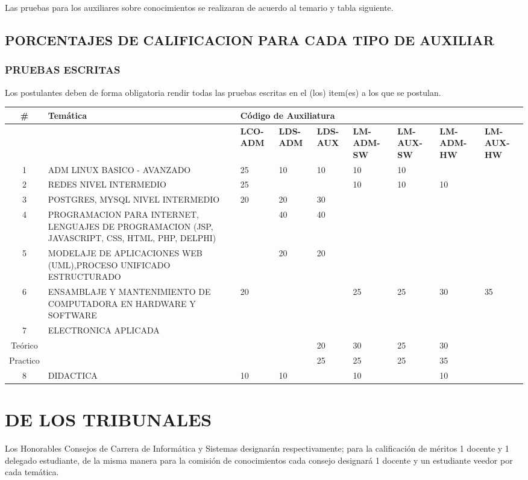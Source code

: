 \documentclass[letterpaper,11pt]{article}
\begin{document}
Las pruebas para los auxiliares sobre conocimientos se realizaran de acuerdo al temario y tabla siguiente.

\subsection{PORCENTAJES DE CALIFICACION PARA CADA TIPO DE AUXILIAR}
\subsubsection{PRUEBAS ESCRITAS}
Los postulantes deben de forma obligatoria rendir todas las pruebas escritas en el (los) item(es) a los que se postulan.

\begin{tabular}{|c|p{5.8cm}|p{0.8cm}|p{0.8cm}|p{0.8cm}|p{0.8cm}|p{0.8cm}|p{0.8cm}|p{0.8cm}|}
\hline
 \textbf{\#  } & \textbf{Temática} & \multicolumn{7}{|l|}{\textbf{Código de Auxiliatura}} \\
\hline
  &  & \textbf{\textbf{LCO-ADM}} & \textbf{LDS-ADM} & \textbf{LDS-AUX} & \textbf{LM-ADM-SW} & \textbf{LM-AUX-SW} & \textbf{LM-ADM-HW} & \textbf{LM-AUX-HW} \\
\hline
 1 & ADM LINUX BASICO - AVANZADO & 25 & 10 & 10 & 10 & 10 &  &  \\
\hline
 2 & REDES NIVEL INTERMEDIO & 25 &  &  & 10 & 10 & 10 &  \\
\hline
 3 & POSTGRES, MYSQL NIVEL INTERMEDIO & 20 & 20 & 30 &  &  &  &  \\
\hline
 4 & PROGRAMACION PARA INTERNET, LENGUAJES DE PROGRAMACION (JSP, JAVASCRIPT, CSS, HTML, PHP, DELPHI) &  & 40 & 40 &  &  &  &  \\
\hline
 5 & MODELAJE DE APLICACIONES WEB (UML),PROCESO UNIFICADO ESTRUCTURADO &  & 20 & 20 &  &  &  &  \\
\hline
 6 & ENSAMBLAJE Y MANTENIMIENTO DE COMPUTADORA EN HARDWARE Y SOFTWARE & 20 &  &  & 25 & 25 & 30 & 35 \\
\hline
 7 & ELECTRONICA APLICADA & \multicolumn{7}{|l|}{} \\
\hline
 Teórico &  &  &  & 20 & 30 & 25 & 30 \\
\hline
 Practico &  &  &  & 25 & 25 & 25 & 35 \\
\hline
 8 & DIDACTICA & 10 & 10 &  & 10 &  & 10 &  \\
\hline
\end{tabular}

\section{DE LOS TRIBUNALES}
Los Honorables Consejos de Carrera de Informática y Sistemas designarán respectivamente; para la calificación de méritos 1 docente y 1 delegado estudiante, de la misma manera para la comisión de conocimientos cada consejo designará 1 docente y un estudiante veedor por cada temática.
\end{document}
